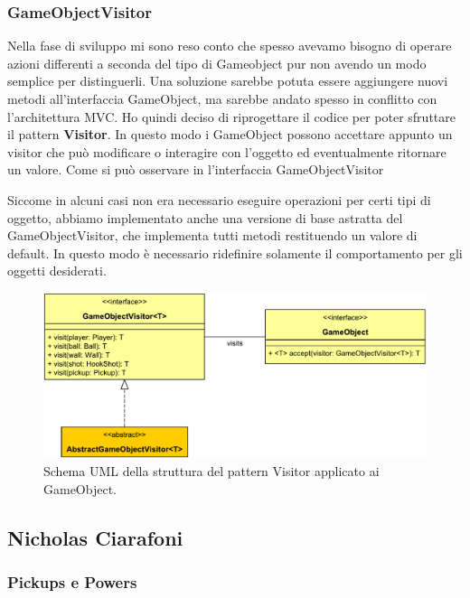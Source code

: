 \documentclass[a4paper,12pt]{report}
\begin{document}
\subsubsection*{GameObjectVisitor}

Nella fase di sviluppo mi sono reso conto che spesso avevamo bisogno di operare azioni differenti a seconda del tipo di Gameobject pur non avendo un modo semplice per distinguerli.
Una soluzione sarebbe potuta essere aggiungere nuovi metodi all'interfaccia GameObject, ma sarebbe andato spesso in conflitto con l'architettura MVC.
Ho quindi deciso di riprogettare il codice per poter sfruttare il pattern \textbf{Visitor}.
In questo modo i GameObject possono accettare appunto un visitor che può modificare o interagire con l'oggetto ed eventualmente ritornare un valore. Come si può osservare in  l'interfaccia GameObjectVisitor 

Siccome in alcuni casi non era necessario eseguire operazioni per certi tipi di oggetto, abbiamo implementato anche una versione di base astratta del GameObjectVisitor, che implementa tutti metodi restituendo un valore di default.
In questo modo è necessario ridefinire solamente il comportamento per gli oggetti desiderati.

\begin{figure}[H]
\includegraphics[width=\linewidth]{img/visitor}
\caption{Schema UML della struttura del pattern Visitor applicato ai GameObject.}
\label{img:visitor}
\end{figure}

\subsection*{Nicholas Ciarafoni}

\subsubsection*{Pickups e Powers}
\end{document}
